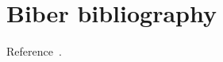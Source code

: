 \documentclass[11pt]{article}
\begin{document}
\section{Biber bibliography}Reference~\cite{knuth}.\printbibliography
\end{document}
